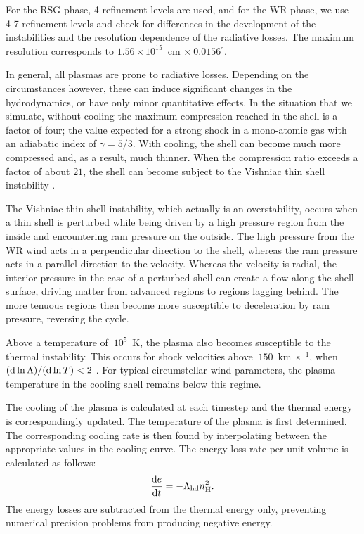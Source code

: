 \documentclass[floatfix,traditabstract,preprint2]{aa}
\begin{document}
For the RSG phase, 4 refinement levels are used, and for the WR phase, we use 4-7 refinement levels and check for differences in the development of the instabilities and the resolution dependence of the radiative losses. The maximum resolution corresponds to $1.56\times10^{15}$~cm $\times\ 0.0156^\circ$.

In general, all plasmas are prone to radiative losses. Depending on the circumstances however, these can induce significant changes in the hydrodynamics, or have only minor quantitative effects.
In the situation that we simulate, without cooling the maximum compression reached in the shell is a factor of four; the value expected for a strong shock in a mono-atomic gas with an adiabatic index of $\gamma=5/3$. With cooling, the shell can become much more compressed and, as a result, much thinner. 
When the compression ratio exceeds a factor of about $21$, the shell can become subject to the Vishniac thin shell instability \citep{1983Vishniac, 1987RyuVishniac,1993MacLowNorman}. 

The Vishniac thin shell instability, which actually is an overstability, occurs when a thin shell is perturbed while being driven by a high pressure region from the inside and encountering ram pressure on the outside. The high pressure from the WR wind acts in a perpendicular direction to the shell, whereas the ram pressure acts in a parallel direction to the velocity. Whereas the velocity is radial, the interior pressure in the case of a perturbed shell can create a flow along the shell surface, driving matter from advanced regions to regions lagging behind. The more tenuous regions then become more susceptible to deceleration by ram pressure, reversing the cycle. 

Above a temperature of $~10^5$~K, the plasma also becomes susceptible to the thermal instability. This occurs for shock velocities above $~150$~km~s$^{-1}$, when $({\rm d}\ln \Lambda)/({\rm d}\ln T) < 2$ \citep[e.g.,][]{1965Field, 1986Bertschinger, 1993SutherlandDopita}. For typical circumstellar wind parameters, the plasma temperature in the cooling shell remains below this regime. 



The cooling of the plasma is calculated at each timestep and the thermal energy is correspondingly updated. The temperature of the plasma is first determined. The corresponding cooling rate is then found by interpolating between the appropriate values in the cooling curve. The energy loss rate per unit volume is calculated as follows:
\begin{eqnarray}
\frac{{\rm d}e}{{\rm d}t}=-\Lambda_{\rm hd}n_{\rm H}^2.
\end{eqnarray}
The energy losses are subtracted from the thermal energy only, preventing numerical precision problems from producing negative energy.
\end{document}
